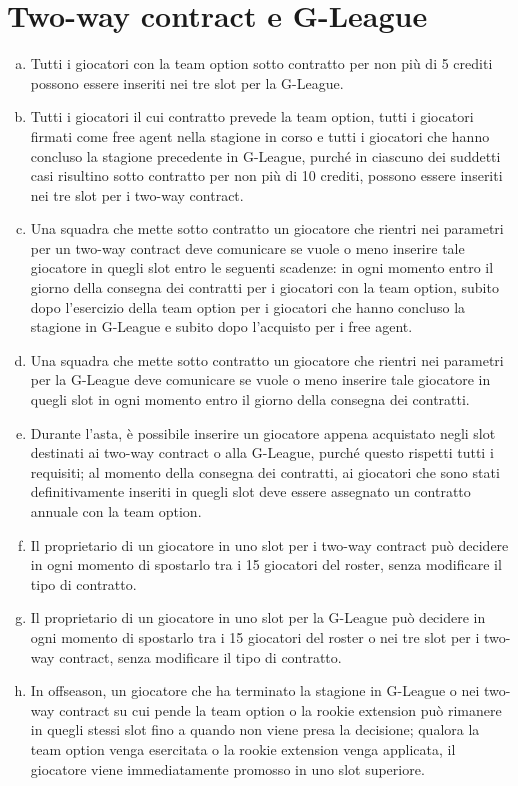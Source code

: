\documentclass{article}
\begin{document}
\section{Two-way contract e G-League}\label{Two-way contract e G-League}
\begin{enumerate}[(a)]
\item Tutti i giocatori con la team option sotto contratto per non più di 5 crediti possono essere inseriti nei tre slot per la G-League.
\item Tutti i giocatori il cui contratto prevede la team option, tutti i giocatori firmati come free agent nella stagione in corso e tutti i giocatori che hanno concluso la stagione precedente in G-League, purché in ciascuno dei suddetti casi risultino sotto contratto per non più di 10 crediti, possono essere inseriti nei tre slot per i two-way contract.
\item Una squadra che mette sotto contratto un giocatore che rientri nei parametri per un two-way contract deve comunicare se vuole o meno inserire tale giocatore in quegli slot entro le seguenti scadenze: in ogni momento entro il giorno della consegna dei contratti per i giocatori con la team option, subito dopo l'esercizio della team option per i giocatori che hanno concluso la stagione in G-League e subito dopo l'acquisto per i free agent.
\item Una squadra che mette sotto contratto un giocatore che rientri nei parametri per la G-League deve comunicare se vuole o meno inserire tale giocatore in quegli slot in ogni momento entro il giorno della consegna dei contratti.
\item Durante l'asta, è possibile inserire un giocatore appena acquistato negli slot destinati ai two-way contract o alla G-League, purché questo rispetti tutti i requisiti; al momento della consegna dei contratti, ai giocatori che sono stati definitivamente inseriti in quegli slot deve essere assegnato un contratto annuale con la team option.
\item Il proprietario di un giocatore in uno slot per i two-way contract può decidere in ogni momento di spostarlo tra i 15 giocatori del roster, senza modificare il tipo di contratto.
\item Il proprietario di un giocatore in uno slot per la G-League può decidere in ogni momento di spostarlo tra i 15 giocatori del roster o nei tre slot per i two-way contract, senza modificare il tipo di contratto.
\item In offseason, un giocatore che ha terminato la stagione in G-League o nei two-way contract su cui pende la team option o la rookie extension può rimanere in quegli stessi slot fino a quando non viene presa la decisione; qualora la team option venga esercitata o la rookie extension venga applicata, il giocatore viene immediatamente promosso in uno slot superiore.

\end{enumerate}
\end{document}
